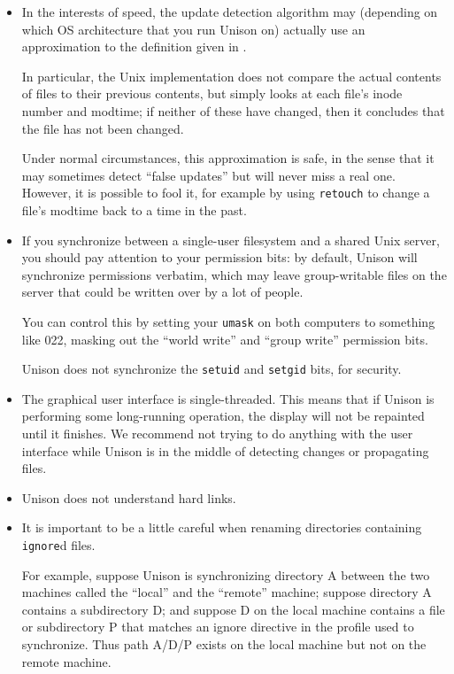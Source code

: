 \documentclass{article}
\begin{document}
\begin{itemize}
\item In the interests of speed, the update detection algorithm may
  (depending on which OS architecture that you run Unison on)
  actually use an approximation to the definition given in
  .

  In particular, the Unix
  implementation does not compare the actual contents of files to their
  previous contents, but simply looks at each file's inode number and
  modtime; if neither of these have changed, then it concludes that the
  file has not been changed.

  Under normal circumstances, this approximation is safe, in the sense
  that it may sometimes detect ``false updates'' but will never miss a real
  one.  However, it is possible to fool it, for example by using
  \verb|retouch| to change a file's modtime back to a time in the past.

\item If you synchronize between a single-user filesystem and a shared
Unix server, you should pay attention to your permission bits: by
default, Unison will synchronize permissions verbatim, which may leave
group-writable files on the server that could be written over by a lot of
people.

You can control this by setting your \verb|umask| on both computers to
something like 022, masking out the ``world write'' and ``group write''
permission bits.

Unison does not synchronize the \verb|setuid| and \verb|setgid| bits, for
security.

\item The graphical user interface is single-threaded.  This
means that if Unison is performing some long-running operation, the
display will not be repainted until it finishes.  We recommend not
trying to do anything with the user interface while Unison is in the
middle of detecting changes or propagating files.

\item Unison does not understand hard links.

\item It is important to be a little careful when renaming directories
containing {\tt ignore}d files.

For example, suppose Unison is synchronizing directory A between the two
machines called the ``local'' and the ``remote'' machine; suppose directory
A contains a subdirectory D; and suppose D on the local machine contains a
file or subdirectory P that matches an ignore directive in the profile used
to synchronize. Thus path A/D/P exists on the local machine but not on the
remote machine.


\end{itemize}
\end{document}
